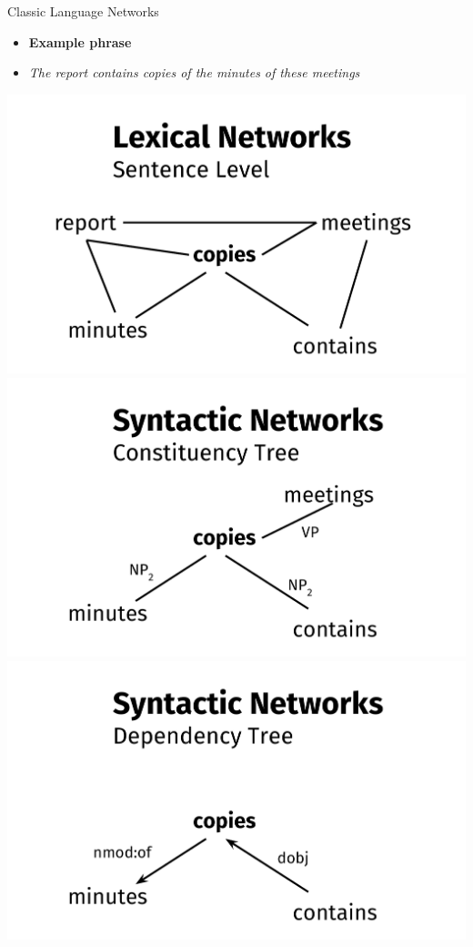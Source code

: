 \documentclass[10pt,=table]{beamer}
\begin{document}
\begin{frame}{Classic Language Networks}

\begin{itemize}
\item[] \large \textbf{Example phrase}
\item[] \textit{The report contains copies of the minutes of these meetings} 
\end{itemize}

\begin{overprint}
	  \centering
	  
	  \includegraphics[width=.6\linewidth]{image2/Chapitre2/lexi_network_ex.pdf}
	  \centering
  	  \includegraphics[width=.6\linewidth]{image2/Chapitre2/consti_network_ex.pdf}   
	  \centering
	  \includegraphics[width=.6\linewidth]{image2/Chapitre2/deps_network_ex.pdf} 

\end{overprint}


\end{frame}
\end{document}
